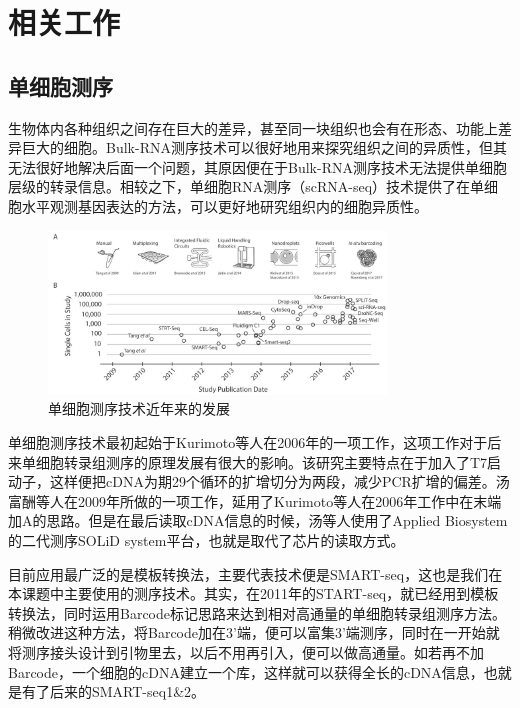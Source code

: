 
\chapter{相关工作}

\section{单细胞测序}
  生物体内各种组织之间存在巨大的差异，甚至同一块组织也会有在形态、功能上差异巨大的细胞。Bulk-RNA测序技术可以很好地用来探究组织之间的异质性，但其无法很好地解决后面一个问题，其原因便在于Bulk-RNA测序技术无法提供单细胞层级的转录信息。相较之下，单细胞RNA测序（scRNA-seq）技术提供了在单细胞水平观测基因表达的方法，可以更好地研究组织内的细胞异质性\cite{hammond2019single,keren2017unique,li2019developmental,masuda2019spatial,masuda2020novel,matcovitch2016microglia}。

\begin{figure}[!htb]
  \centering
  \includegraphics[width=0.8\textwidth]{figs/scseq-development.jpeg}
  \caption{单细胞测序技术近年来的发展}
  \label{fig:scseq-development}
\end{figure}

  单细胞测序技术最初起始于Kurimoto等人在2006年的一项工作\cite{kurimoto2006improved}，这项工作对于后来单细胞转录组测序的原理发展有很大的影响。该研究主要特点在于加入了T7启动子，这样便把cDNA为期29个循环的扩增切分为两段，减少PCR扩增的偏差。汤富酬等人在2009年所做的一项工作\cite{tang2009mrna}，延用了Kurimoto等人在2006年工作\cite{kurimoto2006improved}中在末端加A的思路。但是在最后读取cDNA信息的时候，汤等人使用了Applied Biosystem的二代测序SOLiD system平台，也就是取代了芯片的读取方式。

  目前应用最广泛的是模板转换法，主要代表技术便是SMART-seq\cite{ramskold2012full,picelli2013smart}，这也是我们在本课题中主要使用的测序技术。其实，在2011年的START-seq\cite{islam2011characterization}，就已经用到模板转换法，同时运用Barcode标记思路来达到相对高通量的单细胞转录组测序方法。稍微改进这种方法，将Barcode加在3'端，便可以富集3'端测序，同时在一开始就将测序接头设计到引物里去，以后不用再引入，便可以做高通量。如若再不加Barcode，一个细胞的cDNA建立一个库，这样就可以获得全长的cDNA信息，也就是有了后来的SMART-seq1\&2。

